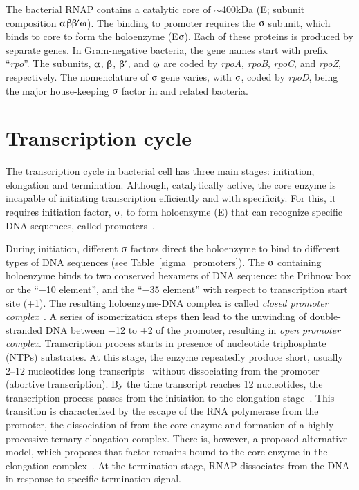 The bacterial RNAP contains a catalytic core of \U{$\sim$400}{kDa}
(E; subunit composition
$\alphaup$$\betaup\betaup'\omegaup$). The binding to
promoter requires the $\sigmaup$ subunit, which binds to core to
form the holoenzyme (E$\sigmaup$). Each of these proteins is
produced by separate genes. In Gram-negative bacteria, the gene
names start with prefix ``\emph{rpo}''. The subunits, $\alphaup$,
$\betaup$, $\betaup'$, and $\omegaup$ are coded by \emph{rpoA},
\emph{rpoB}, \emph{rpoC}, and \emph{rpoZ}, respectively. The
nomenclature of $\sigmaup$ gene varies, with $\sigmaup$,
coded by \emph{rpoD}, being the major house-keeping $\sigmaup$
factor in  and related bacteria.

\section{Transcription cycle}

The transcription cycle in bacterial cell has three main stages:
initiation, elongation and termination. Although, catalytically
active, the core enzyme is incapable of initiating transcription
efficiently and with specificity. For this, it requires initiation
factor, $\sigmaup$, to form holoenzyme (E\s{}) that can recognize
specific DNA sequences, called promoters~\citep{Burgess1969}.

During initiation, different $\sigmaup$ factors direct the
holoenzyme to bind to different types of DNA sequences (see
Table~\ref{sigma_promoters}). The $\sigmaup$ containing
holoenzyme binds to two conserved hexamers of DNA sequence: the
Pribnow box or the ``$-$10 element'', and the ``$-$35 element''
with respect to transcription start site ($+$1). The resulting
holoenzyme-DNA complex is called \emph{closed promoter
complex}~\citep{dehas1998}. A series of isomerization steps then
lead to the unwinding of double-stranded DNA between $-$12 to $+$2
of the promoter, resulting in \emph{open promoter complex}.
Transcription process starts in presence of nucleotide
triphosphate (NTPs) substrates. At this stage, the enzyme
repeatedly produce short, usually 2--12 nucleotides long
transcripts~\citep{Car1980} without dissociating from the promoter
(abortive transcription). By the time transcript reaches 12
nucleotides, the transcription process passes from the initiation
to the elongation stage~\citep{von1998}. This transition is
characterized by the escape of the RNA polymerase from the
promoter, the dissociation of \s{} from the core enzyme and
formation of a highly processive ternary elongation complex. There
is, however, a proposed alternative model, which proposes that
\s{} factor remains bound to the core enzyme in the elongation
complex~\citep{Bar2001}. At the termination stage, RNAP
dissociates from the DNA in response to specific termination
signal.

